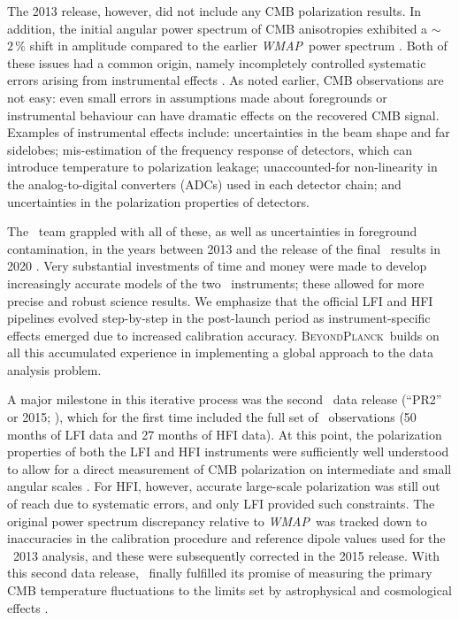 \documentclass[onecolumn]{aa}
\def\WMAP{\emph{WMAP}}
\newcommand{\BP}{\textsc{BeyondPlanck}}
\begin{document}
The 2013 release, however, did not include any CMB polarization
results. In addition, the initial angular power spectrum of CMB
anisotropies exhibited a $\sim$$2\,\%$ shift in amplitude compared to
the earlier \WMAP\ power spectrum \citep{planck2013-p08}. Both of
these issues had a common origin, namely incompletely controlled
systematic errors arising from instrumental effects
\citep{planck2014-a01}.  As noted earlier, CMB observations are not
easy: even small errors in assumptions made about foregrounds or
instrumental behaviour can have dramatic effects on the recovered CMB
signal.  Examples of instrumental effects include: uncertainties in
the beam shape and far sidelobes; mis-estimation of the frequency
response of detectors, which can introduce temperature to polarization
leakage; unaccounted-for non-linearity in the analog-to-digital
converters (ADCs) used in each detector chain; and uncertainties in
the polarization properties of detectors.

The \Planck\ team grappled with all of these, as well as uncertainties
in foreground contamination, in the years between 2013 and the release
of the final \Planck\ results in 2020 \citep{planck2016-l01}.  Very
substantial investments of time and money were made to develop
increasingly accurate models of the two \Planck\ instruments; these
allowed for more precise and robust science results. We emphasize that
the official LFI and HFI pipelines evolved step-by-step in the
post-launch period as instrument-specific effects emerged due to
increased calibration accuracy. \BP\ builds on all this accumulated
experience in implementing a global approach to the data analysis
problem.

A major milestone in this iterative process was the second
\Planck\ data release (``PR2'' or 2015; \citealp{planck2014-a01}),
which for the first time included the full set of
\Planck\ observations (50 months of LFI data and 27 months of HFI
data). At this point, the polarization properties of both the LFI and
HFI instruments were sufficiently well understood to allow for a
direct measurement of CMB polarization on intermediate and small
angular scales \citep{planck2014-a13}.  For HFI, however, accurate
large-scale polarization was still out of reach due to systematic
errors, and only LFI provided such constraints. The original power
spectrum discrepancy relative to \WMAP\ was tracked down to
inaccuracies in the calibration procedure and reference dipole values
used for the \Planck\ 2013 analysis, and these were subsequently
corrected in the 2015 release. With this second data release,
\Planck\ finally fulfilled its promise of measuring the primary CMB
temperature fluctuations to the limits set by astrophysical and
cosmological effects \citep{planck2014-a01}.  
\end{document}
